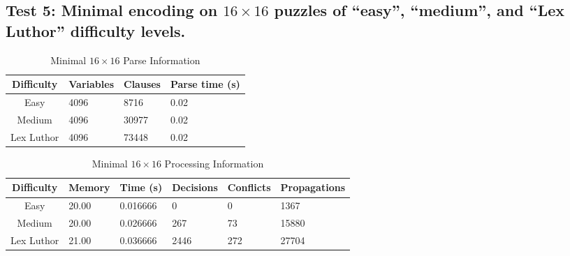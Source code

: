 \documentclass[conference,draftclsnofoot]{IEEEtran}
\begin{document}
\subsection{Test 5: Minimal encoding on $16 \times 16$ puzzles of ``easy'',
``medium'', and ``Lex Luthor'' difficulty levels.}
\FloatBarrier
\begin{table}[!h]
	\centering
	\begin{tabular}{c | l l l}
		Difficulty & Variables & Clauses & Parse time (s) \\\hline
		Easy		& 4096 & 8716  & 0.02\\
		Medium 		& 4096 & 30977 & 0.02\\
		Lex Luthor 	& 4096 & 73448 & 0.02\\
	\end{tabular}
	\caption{Minimal $16 \times 16$ Parse Information}
	\label{tab:minimal_16x16_parse}
\end{table}
\begin{table}[!h]
	\centering

	\begin{tabular}{c | l l p{20pt} p{20pt}  l }
		Difficulty & Memory & Time (s) & Decisions &
		Conflicts & Propagations \\\hline
		Easy 		& 20.00 & 0.016666 & 0  & 0  & 1367\\
		Medium 		& 20.00 & 0.026666 & 267 & 73 & 15880\\
		Lex Luthor 	& 21.00 & 0.036666 & 2446 & 272 & 27704
	\end{tabular}
	\caption{Minimal $16 \times 16$ Processing Information}
	\label{tab:minimal_16x16_proc}
\end{table}
\FloatBarrier
\end{document}
